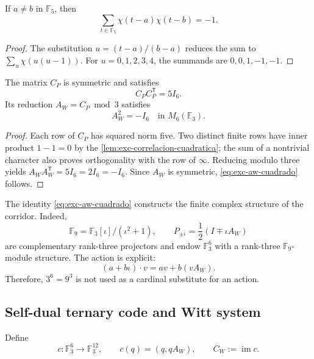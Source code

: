 \begin{lemma}
\label{lem:exc-correlacion-cuadratica}
If \(a\ne b\) in \(\mathbb F_5\), then
\[
 \sum_{t\in\mathbb F_5}\chi(t-a)\chi(t-b)=-1.
\]
\end{lemma}

\begin{proof}
The substitution \(u=(t-a)/(b-a)\) reduces the sum to
\(\sum_u\chi(u(u-1))\). For \(u=0,1,2,3,4\), the summands are
\(0,0,1,-1,-1\).
\end{proof}

\begin{proposition}
\label{prop:exc-paley-witt}
The matrix \(C_P\) is symmetric and satisfies
\[
 C_PC_P^{\mathsf T}=5I_6.
\]
Its reduction \(A_W=C_P\bmod3\) satisfies
\begin{equation}
 \boxed{A_W^2=-I_6\quad\text{in }M_6(\mathbb F_3).}
 \label{eq:exc-aw-cuadrado}
\end{equation}
\end{proposition}

\begin{proof}
Each row of \(C_P\) has squared norm five. Two distinct finite
rows have inner product \(1-1=0\) by the
\cref{lem:exc-correlacion-cuadratica}; the sum of a nontrivial character
also proves orthogonality with the row of \(\infty\). Reducing modulo
three yields
\(A_WA_W^{\mathsf T}=5I_6=2I_6=-I_6\). Since \(A_W\) is symmetric,
\eqref{eq:exc-aw-cuadrado} follows.
\end{proof}

The identity \eqref{eq:exc-aw-cuadrado} constructs the finite complex
structure of the corridor. Indeed,
\[
 \mathbb F_9=\mathbb F_3[\iota]/(\iota^2+1),
 \qquad
 P_{\pm\iota}=\frac12(I\mp\iota A_W)
\]
are complementary rank-three projectors and endow
\(\mathbb F_3^6\) with a rank-three \(\mathbb F_9\)-module structure.
The action is explicit:
\begin{equation}
 (a+b\iota)\cdot v=av+b(vA_W).
 \label{eq:exc-accion-f9}
\end{equation}
Therefore, \(3^6=9^3\) is not used as a cardinal substitute for an action.

\subsection{Self-dual ternary code and Witt system}

Define
\begin{equation}
 c:\mathbb F_3^6\longrightarrow\mathbb F_3^{12},
 \qquad c(q)=(q,qA_W),
 \qquad C_W:=\operatorname{im}c.
 \label{eq:exc-codigo-grafico}
\end{equation}

